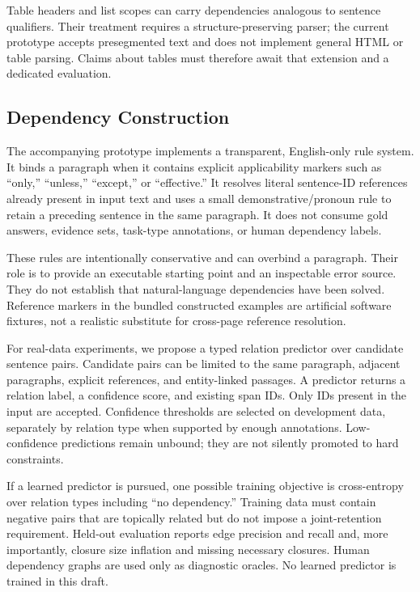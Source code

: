 \documentclass[10pt,twocolumn]{article}
\begin{document}
Table headers and list scopes can carry dependencies analogous to sentence qualifiers. Their treatment requires a structure-preserving parser; the current prototype accepts presegmented text and does not implement general HTML or table parsing. Claims about tables must therefore await that extension and a dedicated evaluation.

\subsection{Dependency Construction}
The accompanying prototype implements a transparent, English-only rule system. It binds a paragraph when it contains explicit applicability markers such as ``only,'' ``unless,'' ``except,'' or ``effective.'' It resolves literal sentence-ID references already present in input text and uses a small demonstrative/pronoun rule to retain a preceding sentence in the same paragraph. It does not consume gold answers, evidence sets, task-type annotations, or human dependency labels.

These rules are intentionally conservative and can overbind a paragraph. Their role is to provide an executable starting point and an inspectable error source. They do not establish that natural-language dependencies have been solved. Reference markers in the bundled constructed examples are artificial software fixtures, not a realistic substitute for cross-page reference resolution.

For real-data experiments, we propose a typed relation predictor over candidate sentence pairs. Candidate pairs can be limited to the same paragraph, adjacent paragraphs, explicit references, and entity-linked passages. A predictor returns a relation label, a confidence score, and existing span IDs. Only IDs present in the input are accepted. Confidence thresholds are selected on development data, separately by relation type when supported by enough annotations. Low-confidence predictions remain unbound; they are not silently promoted to hard constraints.

If a learned predictor is pursued, one possible training objective is cross-entropy over relation types including ``no dependency.'' Training data must contain negative pairs that are topically related but do not impose a joint-retention requirement. Held-out evaluation reports edge precision and recall and, more importantly, closure size inflation and missing necessary closures. Human dependency graphs are used only as diagnostic oracles. No learned predictor is trained in this draft.
\end{document}
